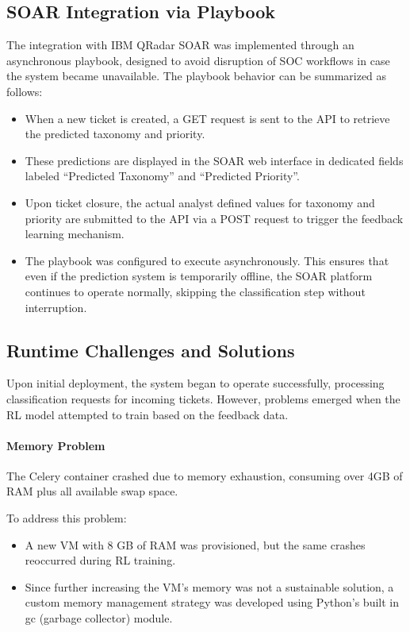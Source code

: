 \subsection{SOAR Integration via Playbook}

The integration with IBM QRadar SOAR was implemented through an asynchronous playbook, designed to avoid disruption of SOC workflows in case the system became unavailable. The playbook behavior can be summarized as follows:

\begin{itemize}
    \item When a new ticket is created, a GET request is sent to the API to retrieve the predicted taxonomy and priority.
    \item These predictions are displayed in the SOAR web interface in dedicated fields labeled ``Predicted Taxonomy'' and ``Predicted Priority''.
    \item Upon ticket closure, the actual analyst defined values for taxonomy and priority are submitted to the API via a POST request to trigger the feedback learning mechanism.
    \item The playbook was configured to execute asynchronously. This ensures that even if the prediction system is temporarily offline, the SOAR platform continues to operate normally, skipping the classification step without interruption.
\end{itemize}

\subsection{Runtime Challenges and Solutions}
Upon initial deployment, the system began to operate successfully, processing classification requests for incoming tickets.
However, problems emerged when the RL model attempted to train based on the feedback data. 

\paragraph{Memory Problem}
The Celery container crashed due to memory exhaustion, consuming over 4GB of RAM plus all available swap space.

To address this problem:
\begin{itemize}
    \item A new VM with 8 GB of RAM was provisioned, but the same crashes reoccurred during RL training.
    \item Since further increasing the VM's memory was not a sustainable solution, a custom memory management strategy was developed using Python's built in gc (garbage collector) module.
\end{itemize} 

